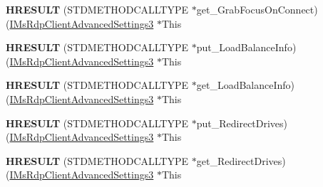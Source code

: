 \begin{DoxyCompactItemize}
\item 
\mbox{\label{struct_m_s_t_s_c_lib_1_1_i_ms_rdp_client_advanced_settings3_vtbl_ac25dc88c82001342f817a0e280b040fc}} 
{\bfseries H\+R\+E\+S\+U\+LT} (S\+T\+D\+M\+E\+T\+H\+O\+D\+C\+A\+L\+L\+T\+Y\+PE $\ast$get\+\_\+\+Grab\+Focus\+On\+Connect)(\hyperlink{interface_m_s_t_s_c_lib_1_1_i_ms_rdp_client_advanced_settings3}{I\+Ms\+Rdp\+Client\+Advanced\+Settings3} $\ast$This
\item 
\mbox{\label{struct_m_s_t_s_c_lib_1_1_i_ms_rdp_client_advanced_settings3_vtbl_a1fb1d21c303630c129b5904ae185f792}} 
{\bfseries H\+R\+E\+S\+U\+LT} (S\+T\+D\+M\+E\+T\+H\+O\+D\+C\+A\+L\+L\+T\+Y\+PE $\ast$put\+\_\+\+Load\+Balance\+Info)(\hyperlink{interface_m_s_t_s_c_lib_1_1_i_ms_rdp_client_advanced_settings3}{I\+Ms\+Rdp\+Client\+Advanced\+Settings3} $\ast$This
\item 
\mbox{\label{struct_m_s_t_s_c_lib_1_1_i_ms_rdp_client_advanced_settings3_vtbl_a6b573ad34542c486704173dcdf70354c}} 
{\bfseries H\+R\+E\+S\+U\+LT} (S\+T\+D\+M\+E\+T\+H\+O\+D\+C\+A\+L\+L\+T\+Y\+PE $\ast$get\+\_\+\+Load\+Balance\+Info)(\hyperlink{interface_m_s_t_s_c_lib_1_1_i_ms_rdp_client_advanced_settings3}{I\+Ms\+Rdp\+Client\+Advanced\+Settings3} $\ast$This
\item 
\mbox{\label{struct_m_s_t_s_c_lib_1_1_i_ms_rdp_client_advanced_settings3_vtbl_aa6190b267d5683291df299fae58cbe61}} 
{\bfseries H\+R\+E\+S\+U\+LT} (S\+T\+D\+M\+E\+T\+H\+O\+D\+C\+A\+L\+L\+T\+Y\+PE $\ast$put\+\_\+\+Redirect\+Drives)(\hyperlink{interface_m_s_t_s_c_lib_1_1_i_ms_rdp_client_advanced_settings3}{I\+Ms\+Rdp\+Client\+Advanced\+Settings3} $\ast$This
\item 
\mbox{\label{struct_m_s_t_s_c_lib_1_1_i_ms_rdp_client_advanced_settings3_vtbl_a7419d8954db72964dfd076af81a0a11a}} 
{\bfseries H\+R\+E\+S\+U\+LT} (S\+T\+D\+M\+E\+T\+H\+O\+D\+C\+A\+L\+L\+T\+Y\+PE $\ast$get\+\_\+\+Redirect\+Drives)(\hyperlink{interface_m_s_t_s_c_lib_1_1_i_ms_rdp_client_advanced_settings3}{I\+Ms\+Rdp\+Client\+Advanced\+Settings3} $\ast$This
\item 

\end{DoxyCompactItemize}
